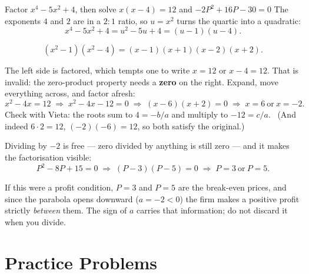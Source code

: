 \begin{worked}{Factor $x^{4}-5x^{2}+4$, then solve $x(x-4)=12$ and $-2P^{2}+16P-30=0$}
The exponents $4$ and $2$ are in a $2\!:\!1$ ratio, so $u=x^{2}$ turns the
quartic into a quadratic:
\[
  x^{4}-5x^{2}+4=u^{2}-5u+4=(u-1)(u-4).
\]

\[
  (x^{2}-1)(x^{2}-4)=(x-1)(x+1)(x-2)(x+2).
\]

The left side is factored, which tempts one to write $x=12$ or $x-4=12$.
That is invalid: the zero-product property needs a \textbf{zero} on the
right. Expand, move everything across, and factor afresh:
\[
  x^{2}-4x=12
  \;\Longrightarrow\;
  x^{2}-4x-12=0
  \;\Longrightarrow\;
  (x-6)(x+2)=0
  \;\Longrightarrow\;
  x=6\ \text{or}\ x=-2 .
\]
Check with Vieta: the roots sum to $4=-b/a$ and multiply to $-12=c/a$.
\checkmark\ (And indeed $6\cdot2=12$, $(-2)(-6)=12$, so both satisfy the
original.)

Dividing by $-2$ is free --- zero divided by anything is still zero --- and
it makes the factorisation visible:
\[
  P^{2}-8P+15=0\;\Longrightarrow\;(P-3)(P-5)=0\;\Longrightarrow\;P=3\ \text{or}\ P=5 .
\]

If this were a profit condition, $P=3$ and $P=5$ are the break-even prices,
and since the parabola opens downward ($a=-2<0$) the firm makes a positive
profit strictly \emph{between} them. The sign of $a$ carries that
information; do not discard it when you divide.
\end{worked}

\section{Practice Problems}

